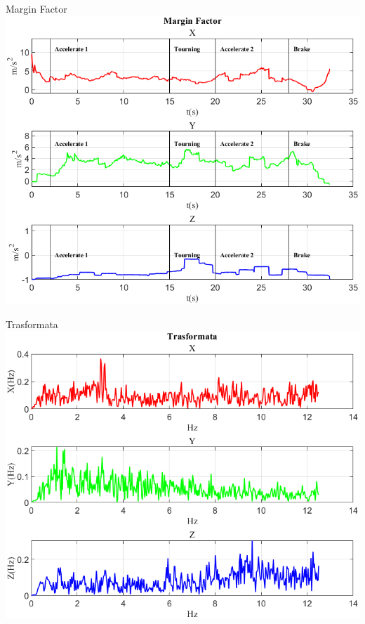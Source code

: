\documentclass[beamer]{standalone}
\begin{document}
	\begin{frame}{{Margin Factor}}
		\centering\includegraphics[height=.8\textheight]{figure/Acc/Margin Factor}
	\end{frame}
	
	\begin{frame}{{Trasformata}}
		\centering\includegraphics[height=.8\textheight]{figure/Acc/Trasformata/Trasformata}
	\end{frame}
\end{document}
